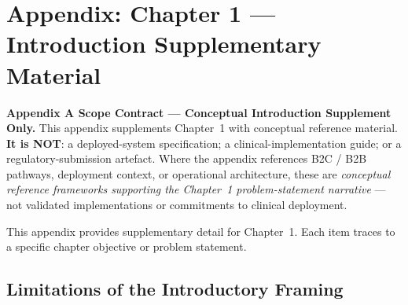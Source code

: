 
\chapter*{Appendix: Chapter 1 --- Introduction Supplementary Material}
\label{chap:appendix_ch1}
\normalsize\normalfont\color{black}

\noindent\textbf{Appendix A Scope Contract --- Conceptual Introduction Supplement Only.}
\label{para:appa_scope_contract}
This appendix supplements Chapter~1 with conceptual reference material. \textbf{It is NOT}: a deployed-system specification; a clinical-implementation guide; or a regulatory-submission artefact. Where the appendix references B2C / B2B pathways, deployment context, or operational architecture, these are \emph{conceptual reference frameworks supporting the Chapter~1 problem-statement narrative} --- not validated implementations or commitments to clinical deployment.

This appendix provides supplementary detail for Chapter~1. Each item traces to a specific chapter objective or problem statement.

\label{fig:appendix_ch1_taskflow}
\label{fig:b2c_flow_main}
\label{tab:b2c_pain_main}
\label{tab:cagr_market}
\label{fig:pain_points}
\label{tab:key_terms_appx}
\label{fig:contribution_map}
\label{tab:app_domain_theories}
\label{sec:appendix_ch1_s2}
\label{sec:pain_points}
\label{sec:key_terms_appx}
\label{sec:appendix_ch1_s5}
\label{sec:appendix_ch1_s7}
\label{sec:appendix_ch1_s8}
\label{sec:appendix_ch1_s9}
\label{tab:app_ch1_publications}
\label{fig:app_framework_components}
\label{tab:app_backend_tables}

\section{Limitations of the Introductory Framing}


